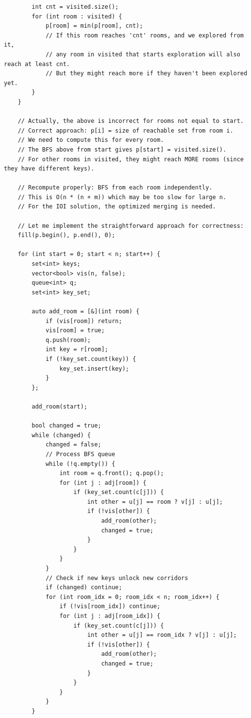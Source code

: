 \documentclass[11pt,a4paper]{article}
\begin{document}
\begin{lstlisting}
        int cnt = visited.size();
        for (int room : visited) {
            p[room] = min(p[room], cnt);
            // If this room reaches 'cnt' rooms, and we explored from it,
            // any room in visited that starts exploration will also reach at least cnt.
            // But they might reach more if they haven't been explored yet.
        }
    }

    // Actually, the above is incorrect for rooms not equal to start.
    // Correct approach: p[i] = size of reachable set from room i.
    // We need to compute this for every room.
    // The BFS above from start gives p[start] = visited.size().
    // For other rooms in visited, they might reach MORE rooms (since they have different keys).

    // Recompute properly: BFS from each room independently.
    // This is O(n * (n + m)) which may be too slow for large n.
    // For the IOI solution, the optimized merging is needed.

    // Let me implement the straightforward approach for correctness:
    fill(p.begin(), p.end(), 0);

    for (int start = 0; start < n; start++) {
        set<int> keys;
        vector<bool> vis(n, false);
        queue<int> q;
        set<int> key_set;

        auto add_room = [&](int room) {
            if (vis[room]) return;
            vis[room] = true;
            q.push(room);
            int key = r[room];
            if (!key_set.count(key)) {
                key_set.insert(key);
            }
        };

        add_room(start);

        bool changed = true;
        while (changed) {
            changed = false;
            // Process BFS queue
            while (!q.empty()) {
                int room = q.front(); q.pop();
                for (int j : adj[room]) {
                    if (key_set.count(c[j])) {
                        int other = u[j] == room ? v[j] : u[j];
                        if (!vis[other]) {
                            add_room(other);
                            changed = true;
                        }
                    }
                }
            }
            // Check if new keys unlock new corridors
            if (changed) continue;
            for (int room_idx = 0; room_idx < n; room_idx++) {
                if (!vis[room_idx]) continue;
                for (int j : adj[room_idx]) {
                    if (key_set.count(c[j])) {
                        int other = u[j] == room_idx ? v[j] : u[j];
                        if (!vis[other]) {
                            add_room(other);
                            changed = true;
                        }
                    }
                }
            }
        }


\end{lstlisting}
\end{document}
